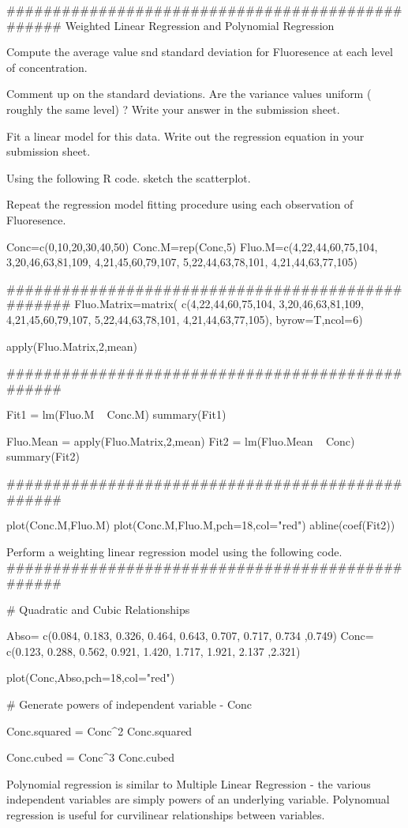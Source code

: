 #################################################
Weighted Linear Regression and Polynomial Regression

Compute the average value snd standard deviation for Fluoresence at each level of concentration.

Comment up on the standard deviations. Are the variance values uniform ( roughly the same level) ? Write your answer in the submission sheet.

Fit a linear model for this data. Write out the regression equation in your submission sheet.

Using the following R code. sketch the scatterplot.

Repeat the regression model fitting procedure using each observation of Fluoresence. 

Conc=c(0,10,20,30,40,50)
Conc.M=rep(Conc,5)
Fluo.M=c(4,22,44,60,75,104,
3,20,46,63,81,109,
4,21,45,60,79,107,
5,22,44,63,78,101,
4,21,44,63,77,105)


##################################################
Fluo.Matrix=matrix(
c(4,22,44,60,75,104,
3,20,46,63,81,109,
4,21,45,60,79,107,
5,22,44,63,78,101,
4,21,44,63,77,105),
byrow=T,ncol=6)

apply(Fluo.Matrix,2,mean)

#################################################

Fit1 = lm(Fluo.M ~ Conc.M)
summary(Fit1)

Fluo.Mean = apply(Fluo.Matrix,2,mean)
Fit2 = lm(Fluo.Mean ~ Conc)
summary(Fit2)

#################################################

plot(Conc.M,Fluo.M)
plot(Conc.M,Fluo.M,pch=18,col="red")
abline(coef(Fit2))


Perform a weighting linear regression model using the following code.
#################################################


# Quadratic and Cubic Relationships


Abso= c(0.084, 0.183, 0.326, 0.464, 0.643, 0.707, 0.717, 0.734 ,0.749)
Conc= c(0.123, 0.288, 0.562, 0.921, 1.420, 1.717, 1.921, 2.137 ,2.321)

plot(Conc,Abso,pch=18,col="red")

# Generate powers of independent variable - Conc

Conc.squared = Conc^2
Conc.squared

Conc.cubed = Conc^3
Conc.cubed

Polynomial regression is similar to Multiple Linear Regression - the various independent variables are simply powers of an underlying variable. Polynomual regression is useful for curvilinear relationships between variables.

